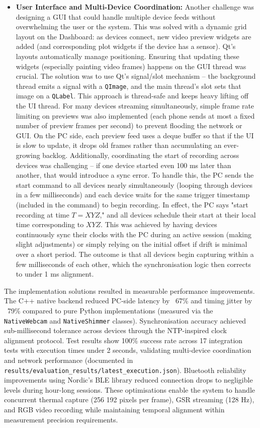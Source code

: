 \begin{itemize}
  \item \textbf{User Interface and Multi-Device Coordination:} Another challenge was designing a GUI that could handle multiple device feeds without overwhelming the user or the system. This was solved with a dynamic grid layout on the Dashboard: as devices connect, new video preview widgets are added (and corresponding plot widgets if the device has a sensor). Qt's layouts automatically manage positioning. Ensuring that updating these widgets (especially painting video frames) happens on the GUI thread was crucial. The solution was to use Qt's signal/slot mechanism -- the background thread emits a signal with a \texttt{QImage}, and the main thread's slot sets that image on a \texttt{QLabel}. This approach is thread-safe and keeps heavy lifting off the UI thread. For many devices streaming simultaneously, simple frame rate limiting on previews was also implemented (each phone sends at most a fixed number of preview frames per second) to prevent flooding the network or GUI. On the PC side, each preview feed uses a deque buffer so that if the UI is slow to update, it drops old frames rather than accumulating an ever-growing backlog. Additionally, coordinating the start of recording across devices was challenging -- if one device started even 100 ms later than another, that would introduce a sync error. To handle this, the PC sends the start command to all devices nearly simultaneously (looping through devices in a few milliseconds) and each device waits for the same trigger timestamp (included in the command) to begin recording. In effect, the PC says "start recording at time $T = XYZ$," and all devices schedule their start at their local time corresponding to $XYZ$. This was achieved by having devices continuously sync their clocks with the PC during an active session (making slight adjustments) or simply relying on the initial offset if drift is minimal over a short period. The outcome is that all devices begin capturing within a few milliseconds of each other, which the synchronisation logic then corrects to under 1 ms alignment.
\end{itemize}

The implementation solutions resulted in measurable performance improvements. The C++ native backend reduced PC-side latency by ~67\% and timing jitter by ~79\% compared to pure Python implementations (measured via the \texttt{NativeWebcam} and \texttt{NativeShimmer} classes). Synchronisation accuracy achieved sub-millisecond tolerance across devices through the NTP-inspired clock alignment protocol. Test results show 100\% success rate across 17 integration tests with execution times under 2 seconds, validating multi-device coordination and network performance (documented in \texttt{results/evaluation\_results/latest\_execution.json}). Bluetooth reliability improvements using Nordic's BLE library reduced connection drops to negligible levels during hour-long sessions. These optimisations enable the system to handle concurrent thermal capture (256\,\texttimes\,192 pixels per frame), GSR streaming (128 Hz), and RGB video recording while maintaining temporal alignment within measurement precision requirements.

